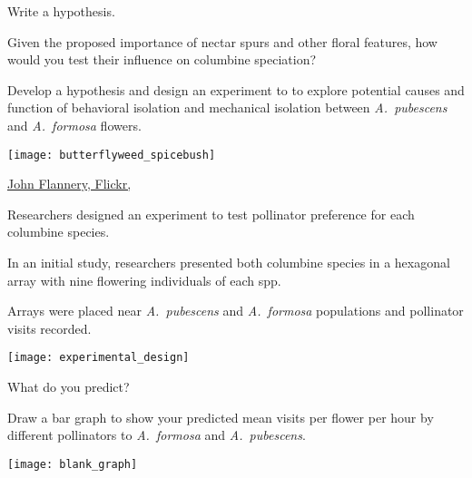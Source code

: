 \documentclass[t,hidelinks]{beamer}
\begin{document}
%
\begin{frame}[t]{Write a hypothesis.}
	
	\begin{multicols}{2}
	\hangpara Given the proposed importance of nectar spurs and other floral features, how would you test their influence on columbine speciation?

	\hangpara Develop a hypothesis and design an experiment to  to explore potential causes and function of behavioral isolation and mechanical isolation between \textit{A.~pubescens} and \textit{A.~formosa} flowers.

	\columnbreak
	
		\texttt{[image: butterflyweed\_spicebush]}
	\end{multicols}

	\vfilll
	
	\hfill \tiny \href{https://www.flickr.com/photos/drphotomoto/3638805249}{John Flannery, Flickr, }
\end{frame}
%
\begin{frame}[t]{Researchers designed an experiment to test pollinator preference for each columbine species.}
	
	\begin{multicols}{2}
	\hangpara In an initial study, researchers presented both columbine species in a hexagonal array with nine flowering individuals of each spp. 
	
	\hangpara Arrays were placed near \textit{A.~pubescens} and \textit{A.~formosa} populations and pollinator visits recorded.
	
	\hangpara {}

	\columnbreak
	
		\texttt{[image: experimental\_design]}
	\end{multicols}

\end{frame}
%
\begin{frame}[t]{What do you predict?}
	
	\vspace*{-\baselineskip}
	
	\hangpara Draw a bar graph to show your predicted mean visits per flower per hour by different pollinators to \textit{A.~formosa} and \textit{A.~pubescens}.
	
	\bigskip
	
	{\centering
		\texttt{[image: blank\_graph]}\par
	}
	
\end{frame}
\end{document}
